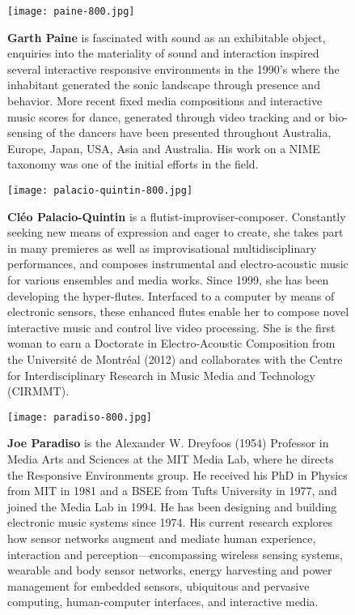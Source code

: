 \begin{authbio}
\begin{figure}[H]
  \sidecaption[t]
  \texttt{[image: paine-800.jpg]}
  \caption{\textbf{Garth Paine} is fascinated with sound as an exhibitable object, enquiries into the materiality of sound and interaction inspired several interactive responsive environments in the 1990's where the inhabitant generated the sonic landscape through presence and behavior. More recent fixed media compositions and interactive music scores for dance, generated through video tracking and or bio-sensing of the dancers have been presented throughout Australia, Europe, Japan, USA, Asia and Australia. His work on a NIME taxonomy %
  was one of the initial efforts in the field.}
\end{figure}

\begin{figure}[H]
  \sidecaption[t]
  \texttt{[image: palacio-quintin-800.jpg]}
  \caption{\textbf{Cl\'eo Palacio-Quintin} is a flutist-improviser-composer. Constantly seeking new means of expression and eager to create, she takes part in many premieres as well as improvisational multidisciplinary performances, and composes instrumental and electro-acoustic music for various ensembles and media works. Since 1999, she has been developing the hyper-flutes. Interfaced to a computer by means of electronic sensors, these enhanced flutes enable her to compose novel interactive music and control live video processing. She is the first woman to earn a Doctorate in Electro-Acoustic Composition from the Universit\'e de Montr\'eal (2012) and collaborates with the Centre for Interdisciplinary Research in Music Media and Technology (CIRMMT).}
\end{figure}

\begin{figure}[H]
  \sidecaption[t]
  \texttt{[image: paradiso-800.jpg]}
  \caption{\textbf{Joe Paradiso} is the Alexander W. Dreyfoos (1954) Professor in Media Arts and Sciences at the MIT Media Lab, where he directs the Responsive Environments group. He received his PhD in Physics from MIT in 1981 and a BSEE from Tufts University in 1977, and joined the Media Lab in 1994. He has been designing and building electronic music systems since 1974. His current research explores how sensor networks augment and mediate human experience, interaction and perception---encompassing wireless sensing systems, wearable and body sensor networks, energy harvesting and power management for embedded sensors, ubiquitous and pervasive computing, human-computer interfaces, and interactive media.}
\end{figure}


\end{authbio}
